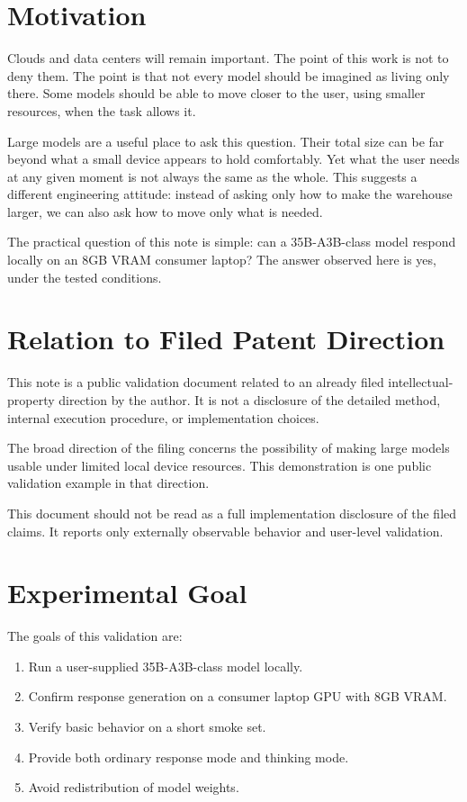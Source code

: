 \documentclass[11pt]{article}
\begin{document}
\section{Motivation}

Clouds and data centers will remain important. The point of this work is not to deny them. The point is that not every model should be imagined as living only there. Some models should be able to move closer to the user, using smaller resources, when the task allows it.

Large models are a useful place to ask this question. Their total size can be far beyond what a small device appears to hold comfortably. Yet what the user needs at any given moment is not always the same as the whole. This suggests a different engineering attitude: instead of asking only how to make the warehouse larger, we can also ask how to move only what is needed.

The practical question of this note is simple: can a 35B-A3B-class model respond locally on an 8GB VRAM consumer laptop? The answer observed here is yes, under the tested conditions.

\section{Relation to Filed Patent Direction}

This note is a public validation document related to an already filed intellectual-property direction by the author. It is not a disclosure of the detailed method, internal execution procedure, or implementation choices.

The broad direction of the filing concerns the possibility of making large models usable under limited local device resources. This demonstration is one public validation example in that direction.

This document should not be read as a full implementation disclosure of the filed claims. It reports only externally observable behavior and user-level validation.

\section{Experimental Goal}

The goals of this validation are:

\begin{enumerate}[leftmargin=1.5em]
  \item Run a user-supplied 35B-A3B-class model locally.
  \item Confirm response generation on a consumer laptop GPU with 8GB VRAM.
  \item Verify basic behavior on a short smoke set.
  \item Provide both ordinary response mode and thinking mode.
  \item Avoid redistribution of model weights.
\end{enumerate}
\end{document}
